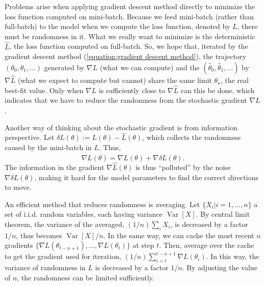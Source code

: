 \documentclass[superscriptaddress,twocolumn,aps,prd,10pt,nofootinbib,preprintnumbers]{revtex4-2}
\newcommand{\assign}{:=}
\newcommand{\tmop}[1]{\ensuremath{\operatorname{#1}}}
\begin{document}
Problems arise when applying gradient descent method directly to minimize the
loss function computed on mini-batch. Because we feed mini-batch (rather than
full-batch) to the model when we compute the loss function, denoted by $L$,
there must be randomness in it. What we really want to minimize is the
deterministic $\hat{L}$, the loss function computed on full-batch. So, we hope
that, iterated by the gradient descent method (\ref{equation:gradient descent
method}), the trajectory $(\theta_0, \theta_1, \ldots)$ generated by $\nabla
L$ (what we can compute) and the $(\hat{\theta}_0, \hat{\theta}_1, \ldots)$ by
$\nabla \hat{L}$ (what we expect to compute but cannot) share the same limit
$\theta_{\star}$, the real best-fit value. Only when $\nabla L$ is
sufficiently close to $\nabla \hat{L}$ can this be done, which indicates that
we have to reduce the randomness from the stochastic gradient $\nabla L$.

Another way of thinking about the stochastic gradient is from information
perspective. Let $\delta L (\theta) \assign L (\theta) - \hat{L} (\theta)$,
which collects the randomness caused by the mini-batch in $L$. Thus,
\begin{equation}
  \nabla L (\theta) = \nabla \hat{L} (\theta) + \nabla \delta L (\theta) .
  \label{equation:stochastic gradient}
\end{equation}
The information in the gradient $\nabla \hat{L} (\theta)$ is thus ``polluted''
by the noise $\nabla \delta L (\theta)$, making it hard for the model
parameters to find the correct directions to move.

An efficient method that reduces randomness is averaging. Let $\{ X_i |i = 1,
\ldots, n \}$ a set of i.i.d. random variables, each having variance
$\tmop{Var} [X]$. By central limit theorem, the variance of the averaged, $(1
/ n)  \sum_i X_i$, is decreased by a factor $1 / n$, thus becomes $\tmop{Var}
[X] / n$. In the same way, we can cache the most recent $n$ gradients $\{
\nabla L (\theta_{t - n + 1}), \ldots, \nabla L (\theta_t) \}$ at step $t$.
Then, average over the cache to get the gradient used for iteration, $(1 / n)
\sum_{i = t}^{t - n + 1} \nabla L (\theta_i)$. In this way, the variance of
randomness in $L$ is decreased by a factor $1 / n$. By adjusting the value of
$n$, the randomness can be limited sufficiently.
\end{document}
